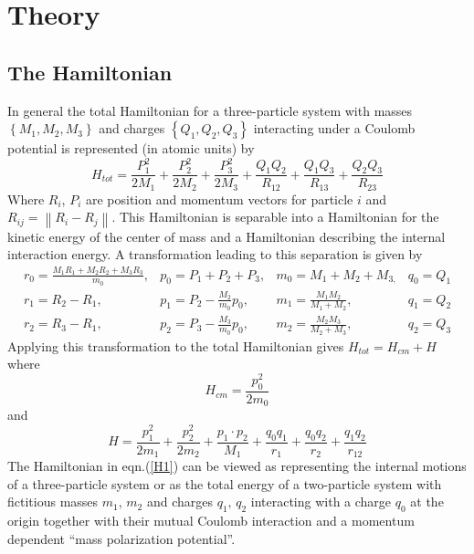 \documentclass[12pt,thmsa]{article}
\begin{document}
\section{Theory}

\subsection{The Hamiltonian}

In general the total Hamiltonian for a three-particle system with masses $%
\left\{ M_1,M_2,M_3\right\} $ and charges $\left\{ Q_1,Q_2,Q_3\right\} $
interacting under a Coulomb potential is represented (in atomic units) by 
\begin{equation}
H_{tot}=\frac{P_1^2}{2M_1}+\frac{P_2^2}{2M_2}+\frac{P_3^2}{2M_3}+\frac{Q_1Q_2%
}{R_{12}}+\frac{Q_1Q_3}{R_{13}}+\frac{Q_2Q_3}{R_{23}}  \label{Htot}
\end{equation}
Where $R_i$, $P_i$ are position and momentum vectors for particle $i$ and $%
R_{ij}=\left\| R_i-R_j\right\| .$ This Hamiltonian is separable into a
Hamiltonian for the kinetic energy of the center of mass and a Hamiltonian
describing the internal interaction energy. A transformation leading to this
separation is given by\cite{Poshusta83} 
\begin{equation}
\begin{array}{llll}
r_0=\frac{M_1R_1+M_2R_2+M_3R_3}{m_0}, & p_0=P_1+P_2+P_3, & m_0=M_1+M_2+M_{3,}
& q_0=Q_1 \\ 
r_1=R_2-R_1, & p_1=P_2-\frac{M_2}{m_0}p_0, & m_1=\frac{M_1M_2}{M_1+M_2}, & 
q_1=Q_2 \\ 
r_2=R_3-R_1, & p_2=P_3-\frac{M_3}{m_0}p_0, & m_2=\frac{M_2M_3}{M_2+M_3}, & 
q_2=Q_3
\end{array}
\label{CMtran}
\end{equation}
Applying this transformation to the total Hamiltonian gives $%
H_{tot}=H_{cm}+H $ where 
\begin{equation}
H_{cm}=\frac{p_0^2}{2m_0}
\end{equation}
and 
\begin{equation}
H=\frac{p_1^2}{2m_1}+\frac{p_2^2}{2m_2}+\frac{p_1\cdot p_2}{M_1}+\frac{q_0q_1%
}{r_1}+\frac{q_0q_2}{r_2}+\frac{q_1q_2}{r_{12}}  \label{H1}
\end{equation}
The Hamiltonian in eqn.(\ref{H1}) can be viewed as representing the internal
motions of a three-particle system or as the total energy of a two-particle
system with fictitious masses $m_1$, $m_2$ and charges $q_1,\,q_2$
interacting with a charge $q_0$ at the origin together with their mutual
Coulomb interaction and a momentum dependent ``mass polarization potential''.
\end{document}

